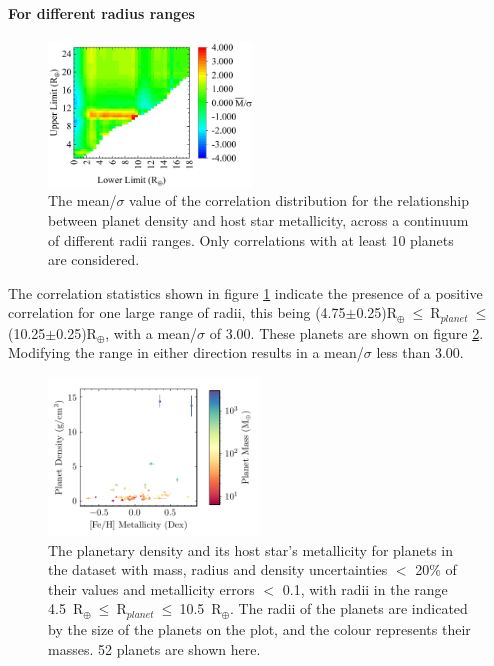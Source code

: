 \documentclass[a4paper,twocolumn,12pt]{article}
\begin{document}


\paragraph{For different radius ranges}
\vspace{-1em}

\begin{figure}[h!]
    \centering
    \includegraphics[width=0.48\textwidth]{Graphs/FeH vs Density correlations - Radius ranges.png}
    \caption{The mean/$\sigma$ value of the correlation distribution for the relationship between planet density and host star metallicity, across a continuum of different radii ranges. Only correlations with at least 10 planets are considered.}
    \label{figure: Fe/H vs Density correlations - Radii ranges}
\end{figure}


The correlation statistics shown in figure \ref{figure: Fe/H vs Density correlations - Radii ranges} indicate the presence of a positive correlation for one large range of radii, this being (4.75$\pm$0.25)R$_{\oplus}~\leq~$R$_{planet}~\leq~$(10.25$\pm$0.25)R$_{\oplus}$, with a mean/$\sigma$ of 3.00. These planets are shown on figure \ref{figure: Fe/H vs Density planet plot - Radii range 1}. Modifying the range in either direction results in a mean/$\sigma$ less than 3.00.

\begin{figure}[h!]
    \centering
    \includegraphics[width=0.5\textwidth]{Graphs/FeH vs Density Planet Plot Radius 4.5 to 10.5.pdf}
    \caption{The planetary density and its host star's metallicity for planets in the dataset with mass, radius and density uncertainties $<$ 20\% of their values and metallicity errors $<$ 0.1, with radii in the range 4.5~R$_{\oplus}~\leq~$R$_{planet}~\leq~$10.5~R$_{\oplus}$. The radii of the planets are indicated by the size of the planets on the plot, and the colour represents their masses. 52 planets are shown here.}
    \label{figure: Fe/H vs Density planet plot - Radii range 1}
\end{figure}
\end{document}
